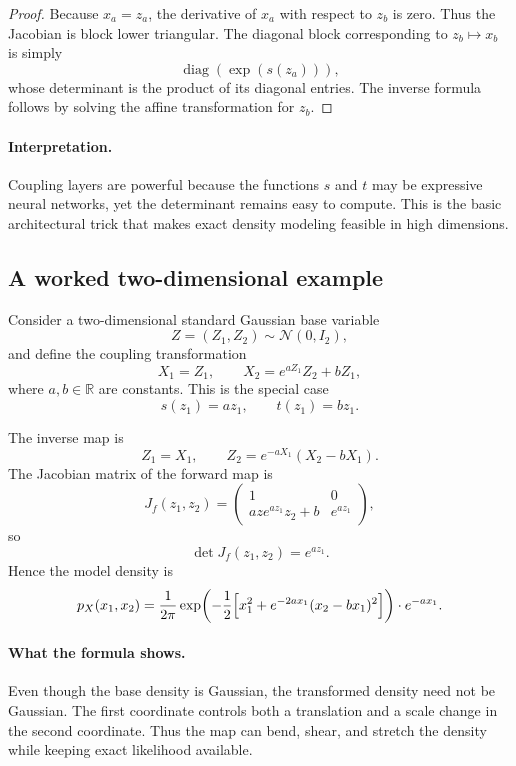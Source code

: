\begin{proof}
Because $x_a=z_a$, the derivative of $x_a$ with respect to $z_b$ is zero.
Thus the Jacobian is block lower triangular.
The diagonal block corresponding to $z_b\mapsto x_b$ is simply
\[
\operatorname{diag}(\exp(s(z_a))),
\]
whose determinant is the product of its diagonal entries.
The inverse formula follows by solving the affine transformation for $z_b$.
\end{proof}

\paragraph{Interpretation.}
Coupling layers are powerful because the functions $s$ and $t$ may be expressive neural networks, yet the determinant remains easy to compute.
This is the basic architectural trick that makes exact density modeling feasible in high dimensions.

\subsection*{A worked two-dimensional example}

Consider a two-dimensional standard Gaussian base variable
\[
Z=(Z_1,Z_2) \sim \mathcal{N}(0,I_2),
\]
and define the coupling transformation
\[
X_1 = Z_1,
\qquad
X_2 = e^{a Z_1} Z_2 + b Z_1,
\]
where $a,b\in\mathbb{R}$ are constants.
This is the special case
\[
s(z_1)=az_1, \qquad t(z_1)=bz_1.
\]

The inverse map is
\[
Z_1=X_1,
\qquad
Z_2=e^{-aX_1}(X_2-bX_1).
\]
The Jacobian matrix of the forward map is
\[
J_f(z_1,z_2)=
\begin{pmatrix}
1 & 0\\
aze^{az_1} z_2 + b & e^{az_1}
\end{pmatrix},
\]
so
\[
\det J_f(z_1,z_2)=e^{az_1}.
\]
Hence the model density is
\[
p_X(x_1,x_2)
=
\frac{1}{2\pi}
\exp\!\left(-\frac{1}{2}\Bigl[x_1^2+e^{-2ax_1}(x_2-bx_1)^2\Bigr]\right)
\cdot e^{-ax_1}.
\]

\paragraph{What the formula shows.}
Even though the base density is Gaussian, the transformed density need not be Gaussian.
The first coordinate controls both a translation and a scale change in the second coordinate.
Thus the map can bend, shear, and stretch the density while keeping exact likelihood available.


